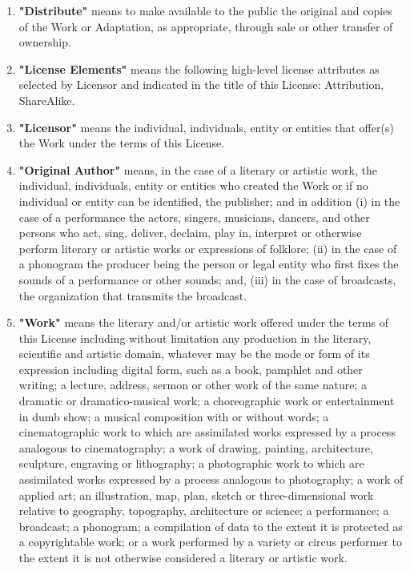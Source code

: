\documentclass[10pt]{book}
\begin{document}
\begin{enumerate}
	\item \textbf{"Distribute"} means to make available           to the public the original and copies of the Work or           Adaptation, as appropriate, through sale or other           transfer of ownership.
	\item \textbf{"License Elements"} means the           following high-level license attributes as selected by           Licensor and indicated in the title of this License:           Attribution, ShareAlike.
	\item \textbf{"Licensor"} means the individual,           individuals, entity or entities that offer(s) the Work           under the terms of this License.
	\item \textbf{"Original Author"} means, in the case           of a literary or artistic work, the individual,           individuals, entity or entities who created the Work or           if no individual or entity can be identified, the           publisher; and in addition (i) in the case of a           performance the actors, singers, musicians, dancers, and           other persons who act, sing, deliver, declaim, play in,           interpret or otherwise perform literary or artistic works           or expressions of folklore; (ii) in the case of a           phonogram the producer being the person or legal entity           who first fixes the sounds of a performance or other           sounds; and, (iii) in the case of broadcasts, the           organization that transmits the broadcast.
	\item \textbf{"Work"} means the literary and/or           artistic work offered under the terms of this License           including without limitation any production in the           literary, scientific and artistic domain, whatever may be           the mode or form of its expression including digital           form, such as a book, pamphlet and other writing; a           lecture, address, sermon or other work of the same           nature; a dramatic or dramatico-musical work; a           choreographic work or entertainment in dumb show; a           musical composition with or without words; a           cinematographic work to which are assimilated works           expressed by a process analogous to cinematography; a           work of drawing, painting, architecture, sculpture,           engraving or lithography; a photographic work to which           are assimilated works expressed by a process analogous to           photography; a work of applied art; an illustration, map,           plan, sketch or three-dimensional work relative to           geography, topography, architecture or science; a           performance; a broadcast; a phonogram; a compilation of           data to the extent it is protected as a copyrightable           work; or a work performed by a variety or circus           performer to the extent it is not otherwise considered a           literary or artistic work.

\end{enumerate}
\end{document}
